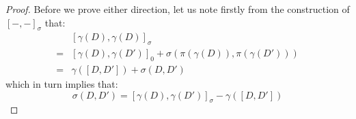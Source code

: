             \begin{proof}
                Before we prove either direction, let us note firstly from the construction of $[-, -]_{\sigma}$ that:
                    $$
                        \begin{aligned}
                            & [\gamma(D), \gamma(D)]_{\sigma}
                            \\
                            = & [\gamma(D), \gamma(D')]_0 + \sigma( \pi(\gamma(D)), \pi(\gamma(D')) )
                            \\
                            = & \gamma([D, D']) + \sigma(D, D')
                        \end{aligned}
                    $$
                which in turn implies that:
                    \begin{equation} \label{equation: 2_cocycle_in_terms_of_section}
                        \sigma(D, D') = [\gamma(D), \gamma(D')]_{\sigma} - \gamma([D, D'])
                    \end{equation}
            

\end{proof}
